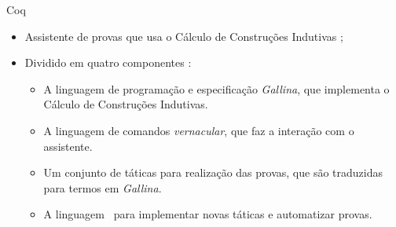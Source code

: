 \begin{frame}{Coq}
    \begin{itemize}
        \item Assistente de provas que usa o Cálculo de Construções Indutivas \cite{bertot2013interactive};
        \item Dividido em quatro componentes \cite{silva2019certificaccao}:
        \begin{itemize}
            \item A linguagem de programação e especificação \textit{Gallina}, que implementa o Cálculo de Construções Indutivas.
            \item A linguagem de comandos \textit{vernacular}, que faz a interação com o assistente.
            \item Um conjunto de táticas para realização das provas, que são traduzidas para termos em \textit{Gallina}.
            \item A linguagem \Ltac\ para implementar novas táticas e automatizar provas.
        \end{itemize}
    \end{itemize}
\end{frame}